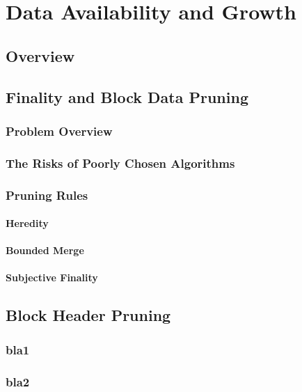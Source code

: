 \chapter{Data Availability and Growth}

\section{Overview}

\section{Finality and Block Data Pruning} 

\subsection{Problem Overview}

\subsection{The Risks of Poorly Chosen Algorithms}

\subsection{Pruning Rules}

\subsubsection*{Heredity}
\subsubsection*{Bounded Merge}
\subsubsection*{Subjective Finality}

\section{Block Header Pruning}

\subsection{bla1}
\subsection{bla2}